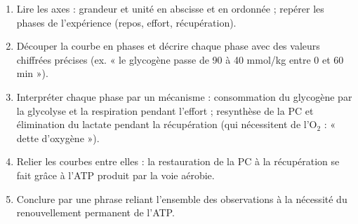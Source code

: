\documentclass[11pt]{article}
\newcommand{\cle}[1]{{\popxbold\color{popdark}#1}}
\begin{document}
\begin{methode}
\begin{enumerate}
\item \cle{Lire les axes} : grandeur et unité en abscisse et en ordonnée ; repérer les phases de l'expérience (repos, effort, récupération).
\item \cle{Découper la courbe en phases} et décrire chaque phase avec des valeurs chiffrées précises (ex. « le glycogène passe de 90 à 40 mmol/kg entre 0 et 60 min »).
\item \cle{Interpréter chaque phase} par un mécanisme : consommation du glycogène par la glycolyse et la respiration pendant l'effort ; resynthèse de la PC et élimination du lactate pendant la récupération (qui nécessitent de l'O$_2$ : « dette d'oxygène »).
\item \cle{Relier les courbes entre elles} : la restauration de la PC à la récupération se fait grâce à l'ATP produit par la voie aérobie.
\item \cle{Conclure} par une phrase reliant l'ensemble des observations à la nécessité du renouvellement permanent de l'ATP.
\end{enumerate}
\end{methode}
\end{document}
